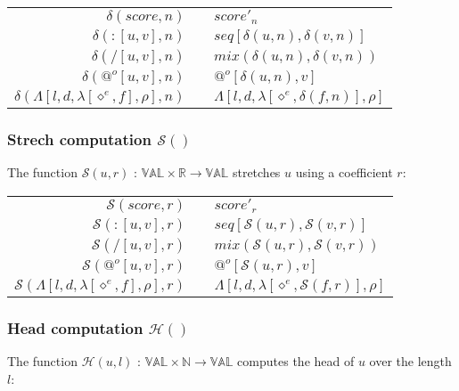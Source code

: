 \documentclass[10pt,a4paper,frenchb]{article}
\makeatletter
\newcommand{\seq}{:}
\newcommand{\var}[1]{\diamond^#1}
\newcommand{\val}{\mathbb{VAL}}
\newcommand{\closure}{\Lambda}
\newcommand{\noredex}{@^o}
\newcommand{\f}[3]{$#1 \times #2 \rightarrow #3$}
\newcommand{\envsym}{\rho}
\newcommand{\closenv}[4][\var{e}]{\closure[#3,#4,\lambda[#1,#2],\envsym]}
\newcommand{\head}		{{\mathcal H}}
\newcommand{\transp}	{\delta}
\renewcommand{\stretch}{{\mathcal S}}
\makeatother
\begin{document}
\begin{center}
\begin{tabular*}{12cm}{rc@{ $\rightarrow$ }l}
 \hline
 $\transp(score,n)$				& & $score'_n$\\
 $\transp(\seq [u,v],n)$			& & $seq[\transp(u, n), \transp(v, n)]$ \\
 $\transp(/ [u,v],n)$ 			& & $mix(\transp(u, n), \transp(v, n))$ \\
 $\transp(\noredex [u,v],n)$ 	& & $\noredex[\transp(u,n),v]$ \\
 $\transp(\closenv{f}{l}{d},n)$ 	& & $\closenv{\transp(f,n)}{l}{d}$ \\
 \hline
\end{tabular*}
\end{center}

\subsubsection{Strech computation $\stretch()$}
The function $\stretch(u,r)$ :  \f{\val}{\mathbb{R}}{\val} stretches $u$ using a coefficient $r$:

\begin{center}
\begin{tabular*}{12cm}{rc@{ $\rightarrow$ }l}
 \hline
 $\stretch(score,r)$				& & $score'_r$\\
 $\stretch(\seq [u,v],r)$			& & $seq[\stretch(u, r), \stretch(v, r)]$ \\
 $\stretch(/ [u,v],r)$ 			& & $mix(\stretch(u, r), \stretch(v, r))$ \\
 $\stretch(\noredex [u,v],r)$ 	& & $\noredex[\stretch(u,r),v]$ \\
 $\stretch(\closenv{f}{l}{d},r)$ 	& & $\closenv{\stretch(f,r)}{l}{d}$ \\
 \hline
\end{tabular*}
\end{center}

\subsubsection{Head computation $\head()$}
The function $\head(u,l)$ :  \f{\val}{\mathbb{N}}{\val} computes the head of $u$ over the length $l$:
\end{document}
